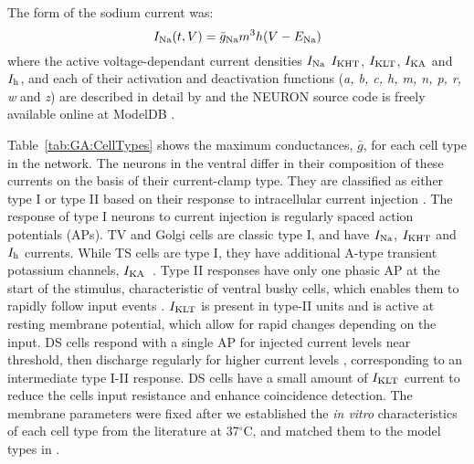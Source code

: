 \smallskip{}

The form of the \HH sodium current was:
\begin{equation} \label{eq:GA:10} 
I_{{\rm Na}} (t,V)=\bar{g}_{{\rm Na}} m^{3} h (V-E_{{\rm Na}} )
\end{equation}
\noindent where the active voltage-dependant current densities
$I_{{\rm Na}}$ $I_{{\rm KHT}}$, $I_{{\rm KLT}}$, $I_{{\rm KA}}$ and
$I_{{\rm h}}$, and each of their activation and deactivation functions
(\textit{a, b, c, h, m, n, p, r, w} and \textit{z}) are described in
detail by \citet{RothmanManis:2003} and the NEURON source code is
freely available online at ModelDB \citep{HinesMorseEtAl:2004}.

\smallskip{}

Table~\ref{tab:GA:CellTypes} shows the maximum conductances,
$\bar{g}$, for each cell type in the network.  The neurons in the
ventral {\CN} differ in their composition of these currents on the basis
of their current-clamp type. They are classified as either type I or
type II based on their response to intracellular current injection
\citep{OertelWuEtAl:1988}. The response of type I neurons to current
injection is regularly spaced action potentials (APs). TV
\citep{ZhangOertel:1993b} and Golgi cells
\citep{FerragamoGoldingEtAl:1998a} are classic type I, and have
$I_{{\rm Na}} $, $I_{{\rm KHT}} $ and $I_{{\rm h}} $ currents. While
TS cells are type I, they have additional A-type transient potassium
channels, $I_{{\rm
    KA}}$~\citep{FerragamoGoldingEtAl:1998,RothmanManis:2003b}. Type
II responses have only one phasic AP at the start of the stimulus,
characteristic of ventral {\CN} bushy cells, which enables them to
rapidly follow {\ANF} input events
\citep{OertelWuEtAl:1988,SmithRhode:1989}. $I_{{\rm KLT}} $ is present
in type-II units and is active at resting membrane potential, which
allow for rapid changes depending on the input. DS cells respond with
a single AP for injected current levels near threshold, then discharge
regularly for higher current levels
\citep{OertelWuEtAl:1988,PaoliniClark:1999}, corresponding to an
intermediate type I-II response. DS cells have a small amount of
$I_{{\rm KLT}} $ current to reduce the cells input resistance and
enhance coincidence detection.  The membrane parameters were fixed
after we established the \textit{in vitro} characteristics of each
cell type from the literature
\citep{FerragamoGoldingEtAl:1998,FerragamoGoldingEtAl:1998a,OertelWuEtAl:1988,ZhangOertel:1993b}
at 37$^\circ$C, and matched them to the model types in
\citet{RothmanManis:2003}.

